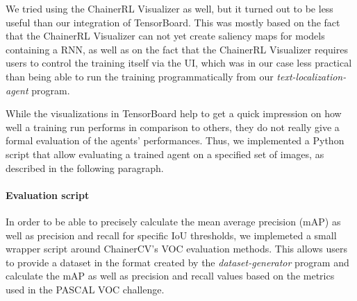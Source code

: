\noindent We tried using the ChainerRL Visualizer\cite{ChainerRLVisualizer} as well, but it turned out to be less useful than our integration of TensorBoard.
This was mostly based on the fact that the ChainerRL Visualizer can not yet create saliency maps for models containing a RNN, as well as on the fact that the ChainerRL Visualizer requires users to control the training itself via the UI, which was in our case less practical than being able to run the training programmatically from our \textit{text-localization-agent} program.

While the visualizations in TensorBoard help to get a quick impression on how well a training run performs in comparison to others, they do not really give a formal evaluation of the agents' performances.
Thus, we implemented a Python script that allow evaluating a trained agent on a specified set of images, as described in the following paragraph.

\paragraph{Evaluation script}

In order to be able to precisely calculate the mean average precision (mAP) as well as precision and recall for specific IoU thresholds, we implemeted a small wrapper script around ChainerCV's VOC evaluation methods\cite{ChainerCVEvalDetectionVOC}.
This allows users to provide a dataset in the format created by the \textit{dataset-generator} program and calculate the mAP as well as precision and recall values based on the metrics used in the PASCAL VOC challenge.
